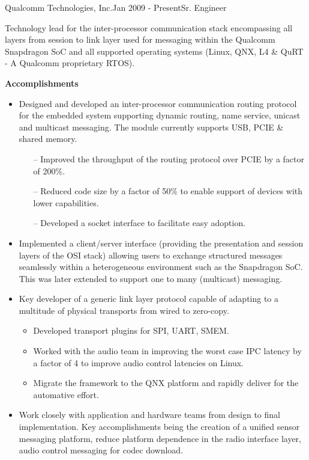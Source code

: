 \begin{rSubsection}{Qualcomm Technologies, Inc.}{Jan 2009 - Present}{Sr. Engineer}{}
  \item[] Technology lead for the inter-processor communication stack encompassing all layers from session to link layer used for messaging within the Qualcomm Snapdragon SoC and all supported operating systems (Linux, QNX, L4 \& QuRT - A Qualcomm proprietary RTOS).
  \item[]
  \item[] \textbf{Accomplishments}
  \begin{itemize}
    \item Designed and developed an inter-processor communication routing protocol for the embedded system supporting dynamic routing, name service, unicast and multicast messaging. The module currently supports USB, PCIE \& shared memory.
    \begin{itemize}
      \item[--] Improved the throughput of the routing protocol over PCIE by a factor of 200\%.
      \item[--] Reduced code size by a factor of 50\% to enable support of devices with lower capabilities.
      \item[--] Developed a socket interface to facilitate easy adoption.
    \end{itemize}
    \item Implemented a client/server interface (providing the presentation and session layers of the OSI stack) allowing users to exchange structured messages seamlessly within a heterogeneous environment such as the Snapdragon SoC. This was later extended to support one to many (multicast) messaging.
    \item Key developer of a generic link layer protocol capable of adapting to a multitude of physical transports from wired to zero-copy.
    \begin{itemize}
     \item Developed transport plugins for SPI, UART, SMEM.
     \item Worked with the audio team in improving the worst case IPC latency by a factor of 4 to improve audio control latencies on Linux.
     \item Migrate the framework to the QNX platform and rapidly deliver for the automative effort.
    \end{itemize}
    \item Work closely with application and hardware teams from design to final implementation. Key accomplishments being the creation of a unified sensor messaging platform, reduce platform dependence in the radio interface layer, audio control messaging for codec download.
  \end{itemize}
\end{rSubsection}

